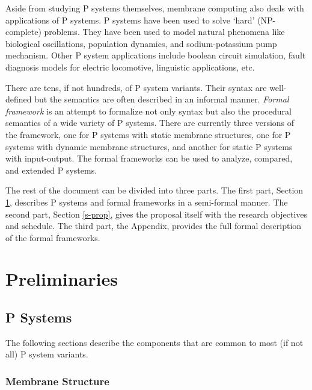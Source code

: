 \documentclass{article}
\begin{document}
Aside from studying P systems themselves, membrane computing also deals with applications of 
P systems. P systems have been used to solve `hard' (NP-complete) problems. They have been used to 
model natural phenomena like biological oscillations, population dynamics, and sodium-potassium pump
mechanism. Other P system applications include boolean circuit simulation, fault diagnosis models
for electric locomotive, linguistic applications, etc.

There are tens, if not hundreds, of P system variants. Their syntax are well-defined but the 
semantics are often described in an informal manner. \emph{Formal framework} is an attempt to 
formalize not only syntax but also the procedural semantics of a wide variety of P systems. There
are currently three versions of the framework, one for P systems with static membrane structures,
one for P systems with dynamic membrane structures, and another for static P systems with 
input-output. The formal frameworks can be used to analyze, compared, and extended P systems.

The rest of the document can be divided into three parts. The first part, Section \ref{s-prelim}, 
describes P systems and formal frameworks in a semi-formal manner. The second part, Section
\ref{s-prop}, gives the proposal itself with the research objectives and schedule. The third part,
the Appendix, provides the full formal description of the formal frameworks. 


\section{Preliminaries} \label{s-prelim}


\subsection{P Systems}\label{s-psystem}

The following sections describe the components that are common to most (if not all) P system 
variants.


\subsubsection{Membrane Structure}\label{s-membrane}
\end{document}
